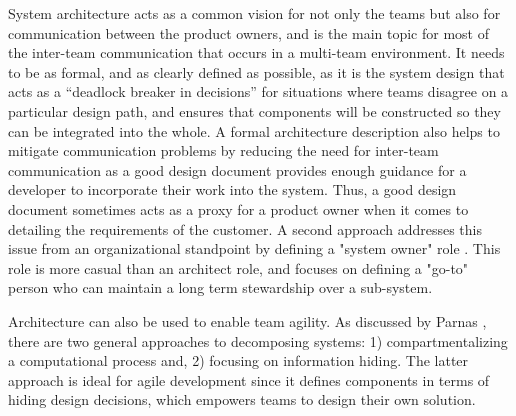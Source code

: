 System architecture acts as a common vision for not only the teams but also for communication between the product owners, and is the main topic for most of the inter-team communication that occurs in a multi-team environment.
It needs to be as formal, and as clearly defined as possible, as it is the system design that acts as a “deadlock breaker in decisions” \cite{architecureRole_article} for situations where teams disagree on a particular design path, and ensures that components will be constructed so they can be integrated into the whole.
%
A formal architecture description also helps to mitigate communication problems by reducing the need for inter-team communication as a good design document provides enough guidance for a developer to incorporate their work into the system.
Thus, a good design document sometimes acts as a proxy for a product owner when it comes to detailing the requirements of the customer.
A second approach addresses this issue from an organizational standpoint by defining a "system owner" role \cite{kniberg12}.
This role is more casual than an architect role, and focuses on defining a "go-to" person who can maintain a long term stewardship over a sub-system. 

Architecture can also be used to enable team agility.
As discussed by Parnas \cite{Parnas72}, there are two general approaches to decomposing systems: 1) compartmentalizing a computational process and, 2) focusing on information hiding.
The latter approach is ideal for agile development since it defines components in terms of hiding design decisions, which empowers teams to design their own solution.